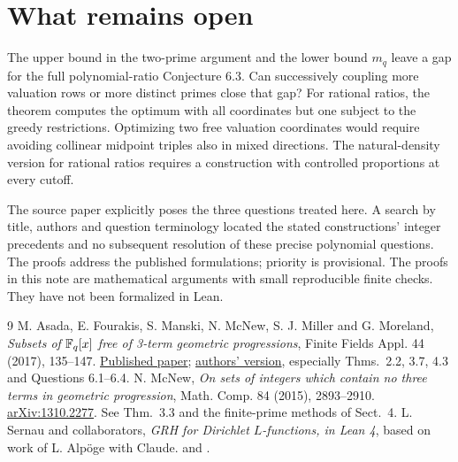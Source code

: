 \documentclass[11pt]{article}
\begin{document}
\section{What remains open}
The upper bound in the two-prime argument and the lower bound $m_q$ leave a gap for the full polynomial-ratio Conjecture 6.3. Can successively coupling more valuation rows or more distinct primes close that gap? For rational ratios, the theorem computes the optimum with all coordinates but one subject to the greedy restrictions. Optimizing two free valuation coordinates would require avoiding collinear midpoint triples also in mixed directions. The natural-density version for rational ratios requires a construction with controlled proportions at every cutoff.

The source paper explicitly poses the three questions treated here. A search by title, authors and question terminology located the stated constructions' integer precedents and no subsequent resolution of these precise polynomial questions. The proofs address the published formulations; priority is provisional. The proofs in this note are mathematical arguments with small reproducible finite checks. They have not been formalized in Lean.

\begin{thebibliography}{9}
 M. Asada, E. Fourakis, S. Manski, N. McNew, S. J. Miller and G. Moreland, \emph{Subsets of $\mathbb F_q[x]$ free of 3-term geometric progressions}, Finite Fields Appl. 44 (2017), 135--147. \href{https://doi.org/10.1016/j.ffa.2016.10.002}{Published paper}; \href{https://www.nathanmcnew.com/fqxramsey.pdf}{authors' version}, especially Thms.~2.2, 3.7, 4.3 and Questions 6.1--6.4.
 N. McNew, \emph{On sets of integers which contain no three terms in geometric progression}, Math. Comp. 84 (2015), 2893--2910. \href{https://arxiv.org/abs/1310.2277}{arXiv:1310.2277}. See Thm.~3.3 and the finite-prime methods of Sect.~4.
 L. Sernau and collaborators, \emph{GRH for Dirichlet $L$-functions, in Lean 4}, based on work of L. Alp\"oge with Claude.  and .
\end{thebibliography}
\end{document}
